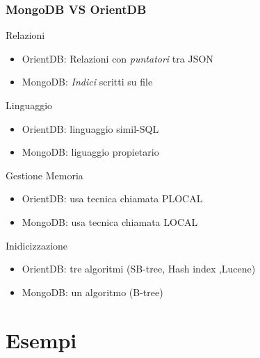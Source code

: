 \documentclass{beamer}
\begin{document}
\begin{frame}
\frametitle{MongoDB VS OrientDB}

\begin{block}{Relazioni}
\begin{itemize}
\item OrientDB: Relazioni con \emph{puntatori} tra JSON
\item MongoDB: \emph{Indici} scritti su file
\end{itemize}
\end{block}

\begin{block}{Linguaggio}
\begin{itemize}
\item OrientDB: linguaggio simil-SQL
\item MongoDB: liguaggio propietario 
\end{itemize}
\end{block}

\begin{block}{Gestione Memoria}
\begin{itemize}
\item OrientDB: usa tecnica chiamata PLOCAL
\item MongoDB:  usa tecnica chiamata LOCAL
\end{itemize}
\end{block}

\begin{block}{Inidicizzazione}
\begin{itemize}
\item OrientDB: tre algoritmi (SB-tree, Hash index ,Lucene)
\item MongoDB:  un algoritmo (B-tree)
\end{itemize}
\end{block}

\end{frame}


\section{Esempi}
\end{document}
